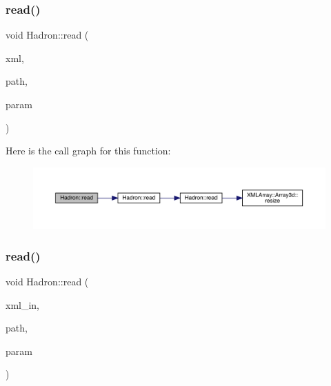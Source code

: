 \subsubsection{\texorpdfstring{read()}{read()}\hspace{0.1cm}{\footnotesize\ttfamily [35/94]}}
{\footnotesize\ttfamily void Hadron\+::read (\begin{DoxyParamCaption}\item[{\mbox{\hyperlink{classADATXML_1_1XMLReader}{X\+M\+L\+Reader}} \&}]{xml,  }\item[{const std\+::string \&}]{path,  }\item[{\mbox{\hyperlink{structHadron_1_1KeySingleHadronQuarkSpin__t}{Key\+Single\+Hadron\+Quark\+Spin\+\_\+t}} \&}]{param }\end{DoxyParamCaption})}

Here is the call graph for this function\+:\nopagebreak
\begin{figure}[H]
\begin{center}
\leavevmode
\includegraphics[width=350pt]{d1/daf/namespaceHadron_a35b28e298745916c37daa929a874e099_cgraph}
\end{center}
\end{figure}
\mbox{\label{namespaceHadron_ae5cdeeff0a8ced82bfb5f5a46595faf8}} 
\subsubsection{\texorpdfstring{read()}{read()}\hspace{0.1cm}{\footnotesize\ttfamily [36/94]}}
{\footnotesize\ttfamily void Hadron\+::read (\begin{DoxyParamCaption}\item[{\mbox{\hyperlink{classADATXML_1_1XMLReader}{X\+M\+L\+Reader}} \&}]{xml\+\_\+in,  }\item[{const std\+::string \&}]{path,  }\item[{\mbox{\hyperlink{structHadron_1_1HadronDiagramTimeSlices__t}{Hadron\+Diagram\+Time\+Slices\+\_\+t}} \&}]{param }\end{DoxyParamCaption})}

